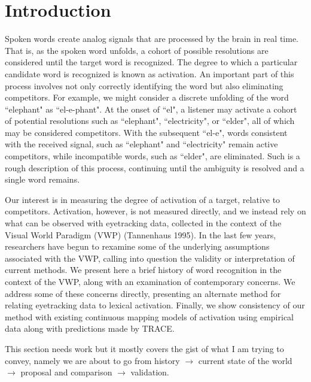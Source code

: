 \documentclass{article}
\begin{document}
\section{Introduction}

Spoken words create analog signals that are processed by the brain in real time. That is, as the spoken word unfolds, a cohort of possible resolutions are considered until the target word is recognized. The degree to which a particular candidate word is recognized is known as activation. An important part of this process involves not only correctly identifying the word but also eliminating competitors. For example, we might consider a discrete unfolding of the word ``elephant" as ``el-e-phant". At the onset of ``el", a listener may activate a cohort of potential resolutions such as ``elephant", ``electricity", or ``elder", all of which may be considered competitors. With the subsequent ``el-e", words consistent with the received signal, such as ``elephant" and ``electricity" remain active competitors, while incompatible words, such as ``elder", are eliminated. Such is a rough description of this process, continuing until the ambiguity is resolved and a single word remains.



Our interest is in measuring the degree of activation of a target, relative to competitors. Activation, however, is not measured directly, and we instead rely on what can be observed with eyetracking data, collected in the context of the Visual World Paradigm (VWP) (Tannenhaus 1995). In the last few years, researchers have begun to rexamine some of the underlying assumptions associated with the VWP, calling into question the validity or interpretation of current methods. We present here a brief history of word recognition in the context of the VWP, along with an examination of contemporary concerns. We address some of these concerns directly, presenting an alternate method for relating eyetracking data to lexical activation. Finally, we show consistency of our method with existing continuous mapping models of activation using empirical data along with predictions made by TRACE.


This section needs work but it mostly covers the gist of what I am trying to convey, namely we are about to go from history $\rightarrow$ current state of the world $\rightarrow$ proposal and comparison $\rightarrow$ validation.
\end{document}
